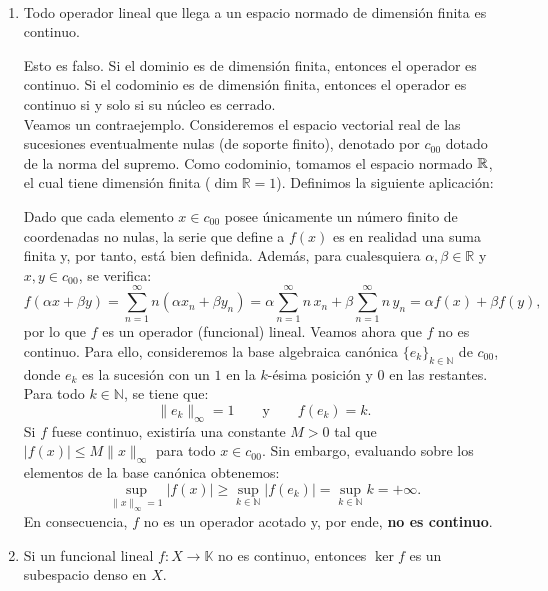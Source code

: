 \documentclass[12pt]{article}
\begin{document}
\begin{ejercicio}~
    \begin{enumerate}[label=(\alph*)]
        \item Todo operador lineal que llega a un espacio normado de dimensión finita es continuo.
        
        Esto es falso. Si el dominio es de dimensión finita, entonces el operador es continuo. Si el codominio es de dimensión finita, entonces el operador es continuo si y solo si su núcleo es cerrado.\\

        Veamos un contraejemplo. Consideremos el espacio vectorial real de las sucesiones eventualmente nulas (de soporte finito), denotado por $c_{00}$  dotado de la norma del supremo. Como codominio, tomamos el espacio normado $\mathbb{R}$, el cual tiene dimensión finita ($\dim \mathbb{R} = 1$). Definimos la siguiente aplicación:
        
        Dado que cada elemento $x \in c_{00}$ posee únicamente un número finito de coordenadas no nulas, la serie que define a $f(x)$ es en realidad una suma finita y, por tanto, está bien definida. Además, para cualesquiera $\alpha, \beta \in \mathbb{R}$ y $x, y \in c_{00}$, se verifica:
        \[
            f(\alpha x + \beta y) = \sum_{n=1}^{\infty} n (\alpha x_n + \beta y_n) = \alpha \sum_{n=1}^{\infty} n \, x_n + \beta \sum_{n=1}^{\infty} n \, y_n = \alpha f(x) + \beta f(y),
        \]
        por lo que $f$ es un operador (funcional) lineal. Veamos ahora que $f$ no es continuo. Para ello, consideremos la base algebraica canónica $\{e_k\}_{k \in \mathbb{N}}$ de $c_{00}$, donde $e_k$ es la sucesión con un $1$ en la $k$-ésima posición y $0$ en las restantes. Para todo $k \in \mathbb{N}$, se tiene que:
        \[
            \|e_k\|_\infty = 1 \qquad \text{y} \qquad f(e_k) = k.
        \]
        Si $f$ fuese continuo, existiría una constante $M > 0$ tal que $|f(x)| \le M \|x\|_\infty$ para todo $x \in c_{00}$. Sin embargo, evaluando sobre los elementos de la base canónica obtenemos:
        \[
            \sup_{\|x\|_\infty = 1} |f(x)| \ge \sup_{k \in \mathbb{N}} |f(e_k)| = \sup_{k \in \mathbb{N}} k = +\infty.
        \]
        En consecuencia, $f$ no es un operador acotado y, por ende, \textbf{no es continuo}.

        \item Si un funcional lineal $f: X \to \mathbb{K}$ no es continuo, entonces $\ker f$ es un subespacio denso en $X$.
        

\end{enumerate}
\end{ejercicio}
\end{document}
